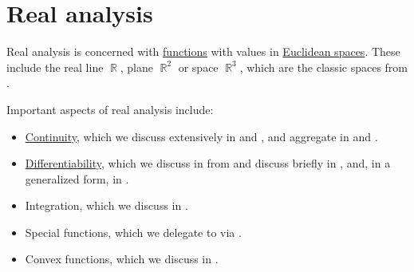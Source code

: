 \chapter{Real analysis}\label{ch:real_analysis}

Real analysis is concerned with \hyperref[def:function]{functions} with values in \hyperref[def:euclidean_space]{Euclidean spaces}. These include the real line \( \BbbR \), plane \( \BbbR^2 \) or space \( \BbbR^3 \), which are the classic spaces from .

Important aspects of real analysis include:
\begin{itemize}
  \item \hyperref[def:local_continuity]{Continuity}, which we discuss extensively in  and , and aggregate in  and .

  \item \hyperref[def:differentiability]{Differentiability}, which we discuss in  from  and discuss briefly in , and, in a generalized form, in .

  \item Integration, which we discuss in .

  \item Special functions, which we delegate to  via .

  \item Convex functions, which we discuss in .
\end{itemize}
